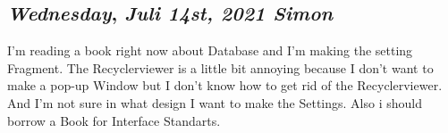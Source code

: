 \begin{center}
\section*{\month}
\end{center}


\def\day{\textit{Juli 14st, 2021 Simon}}
\def\weekday{\textit{Wednesday}}
\subsection*{\weekday, \day}

I'm reading a book right now about Database and I'm making the setting Fragment. The Recyclerviewer is a little bit annoying 
because I don't want to make a pop-up Window but I don't know how to get rid of the Recyclerviewer. And I'm not sure in what design 
I want to make the Settings. Also i should borrow a Book for Interface Standarts.

